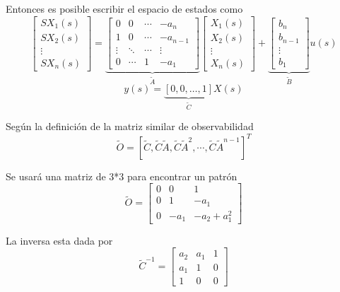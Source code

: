 Entonces es posible escribir el espacio de estados como
\[
    \begin{bmatrix}
        SX_{1}(s) \\
        SX_{2}(s) \\
        \vdots \\
        SX_{n}(s)
    \end{bmatrix}
    =
    \underbrace{
        \begin{bmatrix}
        0 & 0 & \cdots & -a_{n}\\
        1 & 0 & \cdots & -a_{n-1} \\
        \vdots & \ddots & \cdots & \vdots \\
        0 & \cdots & 1 & -a_{1}
        \end{bmatrix}
                }_{\tilde{A}}
    \begin{bmatrix}
        X_{1}(s) \\
        X_{2}(s) \\
        \vdots \\
        X_{n}(s)
    \end{bmatrix}
    +
    \underbrace{
        \begin{bmatrix}
        b_{n}\\
        b_{n-1}\\
        \vdots\\
        b_{1}
        \end{bmatrix}
                }_{\tilde{B}}
     u(s)
\]
\[
    y(s) = \underbrace{[0,0,\ldots,1]}_{\tilde{C}}X(s)
\]

Según la definición de la matriz similar de observabilidad
\[
    \tilde{O} = [
    \tilde{C},
    \tilde{C}\tilde{A},
    \tilde{C}\tilde{A}^{2},
    \cdots,
    \tilde{C}\tilde{A}^{n-1} ]^{T}
\]

Se usará una matriz de 3*3 para encontrar un patrón
\[
    \tilde{O} = 
    \begin{bmatrix}
        0 & 0 & 1 \\
        0 & 1 & -a_{1} \\
        0 & -a_{1} & -a_{2}+a_{1}^{2}
    \end{bmatrix}
\]

La inversa esta dada por
\[
    \tilde{C}^{-1} = 
    \begin{bmatrix}
        a_{2} & a_{1} & 1 \\
        a_{1} & 1 & 0 \\
        1 & 0 & 0
    \end{bmatrix}
\]

